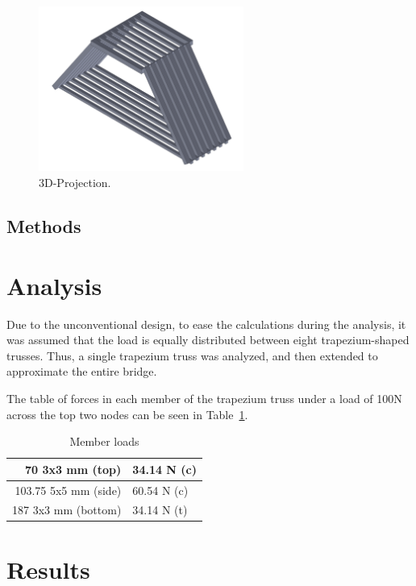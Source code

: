 \documentclass[12pt]{article}
\begin{document}
		\begin{figure}[h!]
			\centering
			\includegraphics[width=0.6\textwidth]{proj}
			\caption{3D-Projection.}
			\label{proj}
		\end{figure}


		\subsection{Methods}


	\section{Analysis}

		Due to the unconventional design, to ease the calculations during the analysis, it was assumed that the load is equally distributed between eight trapezium-shaped trusses. Thus, a single trapezium truss was analyzed, and then extended to approximate the entire bridge.


		The table of forces in each member of the trapezium truss under a load of 100N across the top two nodes can be seen in Table~\ref{loads}.
		

		\begin{table}[h!]
			\caption{Member loads}
			\begin{center}
			\begin{tabular}{ | r | l | }
				\hline
				70 3x3 mm (top) & 34.14 N (c) \\ \hline
				103.75 5x5 mm (side) & 60.54 N (c) \\ \hline
				187 3x3 mm (bottom) & 34.14 N (t) \\ \hline
			\end{tabular}
			\end{center}
			\label{loads}
		\end{table}


	\section{Results}


	
\end{document}
